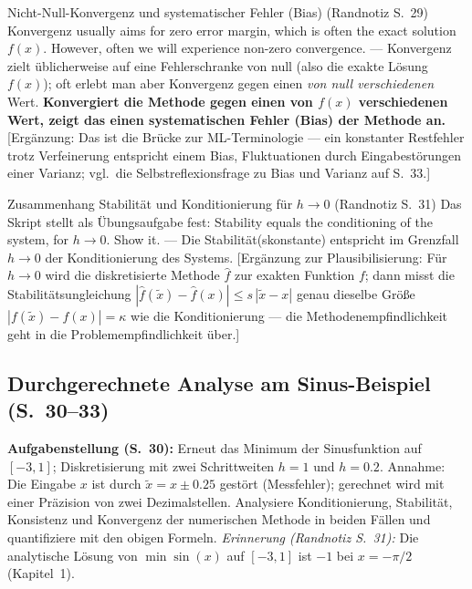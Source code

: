 \begin{satzbox}{Nicht-Null-Konvergenz und systematischer Fehler (Bias) (Randnotiz S.~29)}
Konvergenz \glqq usually aims for zero error margin, which is often the exact solution $f(x)$. However, often we will experience non-zero convergence.\grqq{} — Konvergenz zielt üblicherweise auf eine Fehlerschranke von null (also die exakte Lösung $f(x)$); oft erlebt man aber Konvergenz gegen einen \emph{von null verschiedenen} Wert. \textbf{Konvergiert die Methode gegen einen von $f(x)$ verschiedenen Wert, zeigt das einen systematischen Fehler (Bias) der Methode an.} [Ergänzung: Das ist die Brücke zur ML-Terminologie — ein konstanter Restfehler trotz Verfeinerung entspricht einem Bias, Fluktuationen durch Eingabestörungen einer Varianz; vgl.\ die Selbstreflexionsfrage zu Bias und Varianz auf S.~33.]
\end{satzbox}

\begin{satzbox}{Zusammenhang Stabilität und Konditionierung für $h \to 0$ (Randnotiz S.~31)}
Das Skript stellt als Übungsaufgabe fest: \glqq Stability equals the conditioning of the system, for $h \to 0$. Show it.\grqq{} — Die Stabilität(skonstante) entspricht im Grenzfall $h \to 0$ der Konditionierung des Systems. [Ergänzung zur Plausibilisierung: Für $h \to 0$ wird die diskretisierte Methode $\hat{f}$ zur exakten Funktion $f$; dann misst die Stabilitätsungleichung $|\hat{f}(\tilde{x})-\hat{f}(x)| \le s\,|\tilde{x}-x|$ genau dieselbe Größe $|f(\tilde{x})-f(x)| = \kappa$ wie die Konditionierung — die Methodenempfindlichkeit geht in die Problemempfindlichkeit über.]
\end{satzbox}

\subsection{Durchgerechnete Analyse am Sinus-Beispiel (S.~30--33)}
\textbf{Aufgabenstellung (S.~30):} Erneut das Minimum der Sinusfunktion auf $[-3,1]$; Diskretisierung mit zwei Schrittweiten $h=1$ und $h=0.2$. Annahme: Die Eingabe $x$ ist durch $\tilde{x} = x \pm 0.25$ gestört (Messfehler); gerechnet wird mit einer Präzision von zwei Dezimalstellen. Analysiere Konditionierung, Stabilität, Konsistenz und Konvergenz der numerischen Methode in beiden Fällen und quantifiziere mit den obigen Formeln. \emph{Erinnerung (Randnotiz S.~31):} Die analytische Lösung von $\min \sin(x)$ auf $[-3,1]$ ist $-1$ bei $x = -\pi/2$ (Kapitel~1).


